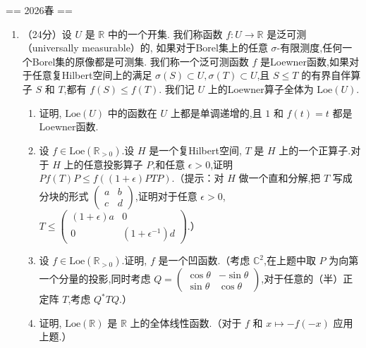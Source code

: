 
== 2026春 ==

\begin{enumerate}

\item[一、]（24分）设 $U$ 是 $\mathbb{R}$ 中的一个开集.
我们称函数 $f:U\to \mathbb{R}$ 是泛可测（universally measurable）的,
如果对于Borel集上的任意 $\sigma$-有限测度,任何一个Borel集的原像都是可测集.
我们称一个泛可测函数 $f$ 是Loewner函数,如果对于任意复Hilbert空间上的满足 $\sigma(S)\subset U,\sigma(T)\subset U$,且 $S\leq T$ 的有界自伴算子 $S$ 和 $T$,都有 $f(S)\leq f(T)$.
我们记 $U$ 上的Loewner算子全体为 $\mathrm{Loe}(U)$.

\begin{enumerate}[label=(\alph*)]
\item 证明, $\mathrm{Loe}(U)$ 中的函数在 $U$ 上都是单调递增的,且 $1$ 和 $f(t)=t$ 都是Loewner函数.

\item 设 $f\in \mathrm{Loe}(\mathbb{R}_{>0})$.设 $H$ 是一个复Hilbert空间, $T$ 是 $H$ 上的一个正算子.对于 $H$ 上的任意投影算子 $P$,和任意 $\epsilon>0$,证明 $P f(T) P\leq f((1+\epsilon)PTP)$.（提示：对 $H$ 做一个直和分解,把 $T$ 写成分块的形式 $\begin{pmatrix} a & b \\ c & d \end{pmatrix}$,证明对于任意 $\epsilon>0$, $T\leq \begin{pmatrix} (1+\epsilon)a & 0 \\ 0 & (1+\epsilon^{-1})d \end{pmatrix}$.）

\item 设 $f\in \mathrm{Loe}(\mathbb{R}_{>0})$.证明, $f$ 是一个凹函数.（考虑 $\mathbb{C}^2$,在上题中取 $P$ 为向第一个分量的投影,同时考虑 $Q=\begin{pmatrix} \cos\theta & -\sin\theta \\ \sin\theta & \cos\theta \end{pmatrix}$,对于任意的（半）正定阵 $T$,考虑 $Q^*TQ$.）

\item 证明, $\mathrm{Loe}(\mathbb{R})$ 是 $\mathbb{R}$ 上的全体线性函数.（对于 $f$ 和 $x\mapsto -f(-x)$ 应用上题.）


\end{enumerate}
\end{enumerate}
